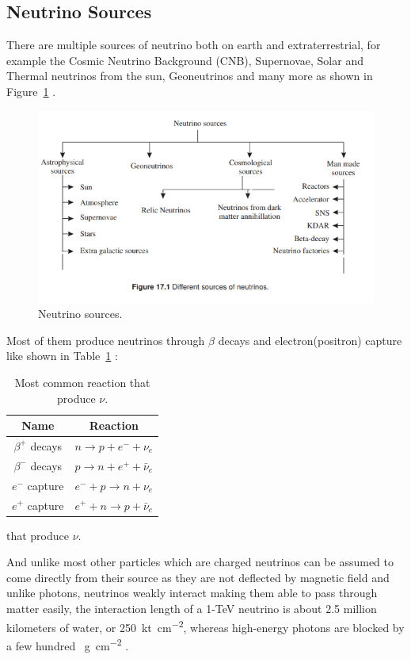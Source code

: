 \subsection{Neutrino Sources}
There are multiple sources of neutrino both on earth and extraterrestrial, for example the Cosmic Neutrino Background (CNB), Supernovae, Solar and Thermal neutrinos from the sun, Geoneutrinos and many more as shown in Figure~\ref{fig:Nsource} . 
\begin{figure}[H]
	\centering
	\includegraphics[width=\textwidth]{assets/NeutrinoSourcesSajjad.png}
	\caption{Neutrino sources.}
	\label{fig:Nsource}
\end{figure}

Most of them produce neutrinos through $\beta$ decays and electron(positron) capture like shown in Table~\ref{tab:reaction}  :
\begin{table}[H]
	\centering
	\caption{Most common reaction that produce $\nu$.}
	\label{tab:reaction}
	\begin{tabular}{cc}
		\toprule
		Name & Reaction \\
		\midrule
		$\beta^+$ decays & $n\rightarrow p+e^-+\nu_e$ \\
		$\beta^-$ decays & $p\rightarrow n+e^++\bar\nu_e$ \\
		$e^-$ capture & $e^-+p\rightarrow n+\nu_e$ \\
		$e^+$ capture & $e^++n\rightarrow p+\bar\nu_e$ \\
		\bottomrule
	\end{tabular}
\end{table}
that produce $\nu$.

And unlike most other particles which are charged neutrinos can be assumed to come directly from their source as they are not deflected by magnetic field and unlike photons, neutrinos weakly interact making them able to pass through matter easily, the interaction length of a 1-TeV neutrino is about 2.5 million kilometers of water, or \SI{250}{\kilo\tonne\per\centi\meter\squared}, whereas high-energy photons are blocked by a few hundred \SI{}{\gram\per\centi\meter\squared} .

